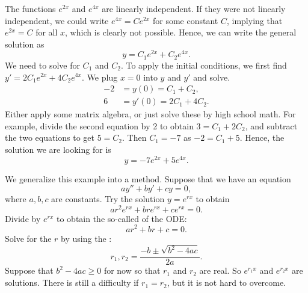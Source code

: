 The functions $e^{2x}$ and $e^{4x}$ are linearly independent.  If they
were not linearly independent, we could write $e^{4x} = C e^{2x}$ for
some constant $C$,
implying that $e^{2x} = C$ for all $x$, which is clearly not possible. 
Hence, we can write the general solution as
\begin{equation*}
y = C_1 e^{2x} + C_2 e^{4x} .
\end{equation*}
We need to solve for $C_1$ and $C_2$.  To apply the initial conditions,
we first find $y' = 2 C_1 e^{2x} + 4 C_2 e^{4x}$.  We plug $x=0$ into
$y$ and $y'$ and solve.
\begin{equation*}
\begin{aligned}
-2 & = y(0) = C_1 + C_2 , \\
6 & = y'(0) = 2 C_1 + 4 C_2 .
\end{aligned}
\end{equation*}
Either apply some matrix algebra, or just solve these by high school
math.  For example, divide the second equation by 2
to obtain $3 = C_1 + 2 C_2$, and subtract the two equations to
get $5 = C_2$.  Then $C_1 = -7$ as $-2 = C_1 + 5$.  Hence, the solution we
are
looking for is
\begin{equation*}
y = -7 e^{2x} + 5 e^{4x} .
\end{equation*}

\medskip

We generalize this example into a method.
Suppose that we have an equation
\begin{equation} \label{ccsol:eq}
a y'' + b y' + c y = 0 ,
\end{equation}
where $a, b, c$ are constants.  Try the solution $y = e^{rx}$ to obtain
\begin{equation*}
a r^2 e^{rx} + 
b r e^{rx} + 
c e^{rx} = 0 .
\end{equation*}
Divide by $e^{rx}$ to obtain the so-called
\emph{} of the ODE:
\begin{equation*}
a r^2 + 
b r + 
c = 0 .
\end{equation*}
Solve for the $r$ by using the :
\begin{equation*}
r_1, r_2 = \frac{-b \pm \sqrt{b^2 - 4ac}}{2a} .
\end{equation*}
Suppose that $b^2 -4ac \geq 0$ for now so that $r_1$ and $r_2$ are real.
So $e^{r_1 x}$ and $e^{r_2 x}$ are solutions.  There is
still a difficulty if $r_1 = r_2$, but it is not hard to overcome.


